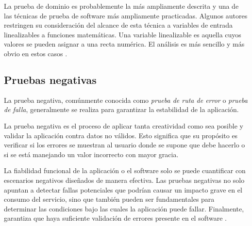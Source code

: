 La prueba de dominio es probablemente la más ampliamente descrita y una de las
técnicas de prueba de software más ampliamente practicadas. Algunos autores
restringen su consideración del alcance de esta técnica a variables de entrada
linealizables a funciones matemáticas. Una variable linealizable es aquella
cuyos valores se pueden asignar a una recta numérica. El análisis es más
sencillo y más obvio en estos casos \parencite{Kaner}.

\subsection{Pruebas negativas}
La prueba negativa, comúnmente conocida como \emph{prueba de ruta de error} o
\emph{prueba de falla}, generalmente se realiza para garantizar la estabilidad
de la aplicación.

La prueba negativa es el proceso de aplicar tanta creatividad como sea posible y
validar la aplicación contra datos no válidos. Esto significa que su propósito
es verificar si los errores se muestran al usuario donde se supone que debe
hacerlo o si se está manejando un valor incorrecto con mayor gracia.

La fiabilidad funcional de la aplicación o el software solo se puede cuantificar
con escenarios negativos diseñados de manera efectiva. Las pruebas negativas no
solo apuntan a detectar fallas potenciales que podrían causar un impacto grave
en el consumo del servicio, sino que también pueden ser fundamentales para
determinar las condiciones bajo las cuales la aplicación puede fallar.
Finalmente, garantiza que haya suficiente validación de errores presente en el
software \parencite{Nadig}.

